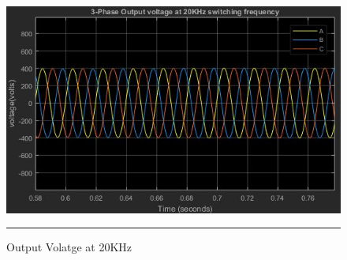 \begin{figure}[htbp]
	\centering
	\includegraphics[width = 6in]{./Figures/20k.JPG}
	\rule{35em}{1pt}
	\caption{Output Volatge at 20KHz}
\end{figure}
\newpage

